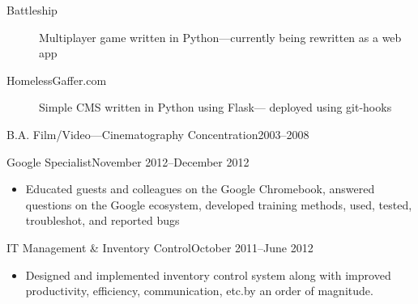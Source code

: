 \documentclass[letterpaper]{article}        %
\begin{document}
\begin{multicols}{3}

      \begin{itemize}
      \end{itemize}
  \end{multicols}


  \begin{description}
    \item[Battleship] Multiplayer game written in Python---currently being %
                      rewritten as a web app
    \item[HomelessGaffer.com] Simple CMS written in Python using Flask---%
                              deployed using git-hooks
  \end{description}


            {B.A. Film/Video---Cinematography Concentration}{2003--2008}


            {Google Specialist}{November 2012--December 2012}
    \begin{itemize}
      \item Educated guests and colleagues on the Google Chromebook, answered %
            questions on the Google ecosystem, developed training methods, %
            used, tested, troubleshot, and reported bugs
    \end{itemize}

            {IT Management \& Inventory Control}{October 2011--June 2012}
    \begin{itemize}
      \item Designed and implemented inventory control system along with %
            improved productivity, efficiency, communication, etc.\@ by an %
            order of magnitude.
    \end{itemize}
\end{document}
